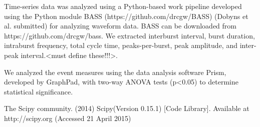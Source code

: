 \documentclass{article}
\begin{document}
Time-series data was analyzed using a Python-based work pipeline developed using the Python module BASS (https://github.com/drcgw/BASS)  (Dobyns et al. submitted) for analyzing waveform data. BASS can be downloaded from https://github.com/drcgw/bass. We extracted interburst interval, burst duration,  intraburst frequency, total cycle time, peaks-per-burst, peak amplitude, and inter-peak interval.<must define these!!!>.

We analyzed the event measures using the data analysis software Prism, developed by GraphPad, with two-way ANOVA tests (p<0.05) to determine statistical significance. 



The Scipy community. (2014) Scipy(Version 0.15.1) [Code Library]. Available at http://scipy.org (Accessed 21 April 2015)
\end{document}
